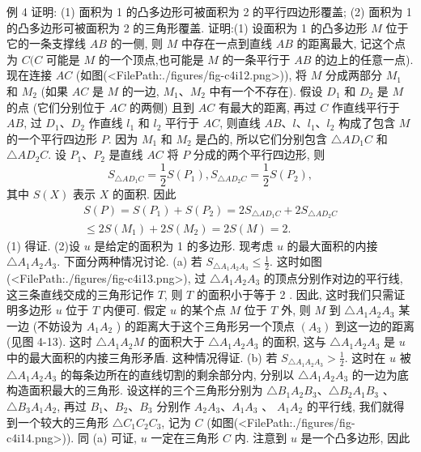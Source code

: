 例 4 证明: (1) 面积为 1 的凸多边形可被面积为 2 的平行四边形覆盖;
(2) 面积为 1 的凸多边形可被面积为 2 的三角形覆盖.
证明:(1) 设面积为 1 的凸多边形 $M$ 位于它的一条支撑线 $A B$ 的一侧, 则 $M$ 中存在一点到直线 $A B$ 的距离最大, 记这个点为 $C(C$ 可能是 $M$ 的一个顶点,也可能是 $M$ 的一条平行于 $A B$ 的边上的任意一点). 现在连接 $A C$ (如图(<FilePath:./figures/fig-c4i12.png>)), 将 $M$ 分成两部分 $M_1$ 和 $M_2$ (如果 $A C$ 是 $M$ 的一边, $M_1 、 M_2$ 中有一个不存在). 假设 $D_1$ 和 $D_2$ 是 $M$ 的点 (它们分别位于 $A C$ 的两侧) 且到 $A C$ 有最大的距离, 再过 $C$ 作直线平行于 $A B$, 过 $D_1 、 D_2$ 作直线 $l_1$ 和 $l_2$ 平行于 $A C$, 则直线 $A B 、 l 、 l_1 、 l_2$ 构成了包含 $M$ 的一个平行四边形 $P$.
因为 $M_1$ 和 $M_2$ 是凸的, 所以它们分别包含 $\triangle A D_1 C$ 和 $\triangle A D_2 C$.
设 $P_1 、 P_2$ 是直线 $A C$ 将 $P$ 分成的两个平行四边形, 则
$$
S_{\triangle A D_1 C}=\frac{1}{2} S\left(P_1\right), S_{\triangle A D_2 C}=\frac{1}{2} S\left(P_2\right),
$$
其中 $S(X)$ 表示 $X$ 的面积.
因此
$$
\begin{gathered}
S(P)=S\left(P_1\right)+S\left(P_2\right)=2 S_{\triangle A D_1 C}+2 S_{\triangle A D_2 C} \\
\leqslant 2 S\left(M_1\right)+2 S\left(M_2\right)=2 S(M)=2 .
\end{gathered}
$$
(1) 得证.
(2)设 $u$ 是给定的面积为 1 的多边形.
现考虑 $u$ 的最大面积的内接 $\triangle A_1 A_2 A_3$. 下面分两种情况讨论.
(a) 若 $S_{\triangle A_1 A_2 A_3} \leqslant \frac{1}{2}$. 这时如图(<FilePath:./figures/fig-c4i13.png>), 过 $\triangle A_1 A_2 A_3$ 的顶点分别作对边的平行线, 这三条直线交成的三角形记作 $T$, 则 $T$ 的面积小于等于 2 .
因此, 这时我们只需证明多边形 $u$ 位于 $T$ 内便可.
假定 $u$ 的某个点 $M$ 位于 $T$ 外, 则 $M$ 到 $\triangle A_1 A_2 A_3$ 某一边 (不妨设为 $A_1 A_2$ ) 的距离大于这个三角形另一个顶点 $\left(A_3\right)$ 到这一边的距离 (见图 4-13). 这时 $\triangle A_1 A_2 M$ 的面积大于 $\triangle A_1 A_2 A_3$ 的面积, 这与 $\triangle A_1 A_2 A_3$ 是 $u$ 中的最大面积的内接三角形矛盾.
这种情况得证.
(b) 若 $S_{\triangle A_1 A_2 A_3}>\frac{1}{2}$. 这时在 $u$ 被 $\triangle A_1 A_2 A_3$ 的每条边所在的直线切割的剩余部分内, 分别以 $\triangle A_1 A_2 A_3$ 的一边为底构造面积最大的三角形.
设这样的三个三角形分别为 $\triangle B_1 A_2 B_3 、 \triangle B_2 A_1 B_3$ 、 $\triangle B_3 A_1 A_2$, 再过 $B_1 、 B_2 、 B_3$ 分别作 $A_2 A_3 、 A_1 A_3$ 、 $A_1 A_2$ 的平行线, 我们就得到一个较大的三角形 $\triangle C_1 C_2 C_3$, 记为 $C$ (如图(<FilePath:./figures/fig-c4i14.png>)). 同 (a) 可证, $u$ 一定在三角形 $C$ 内.
注意到 $u$ 是一个凸多边形, 因此
